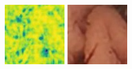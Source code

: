 \documentclass[conference]{IEEEtran}
\begin{document}
\begin{figure}[!t]
        \vfill
        \includegraphics[width=\linewidth]{Figures/906/906_cycleGAN_ssim.jpg}
        
    \endminipage\hfill
        \centering
        \includegraphics[width=\linewidth]{Figures/906/906_Densenet.jpg}
        

\end{figure}
\end{document}
